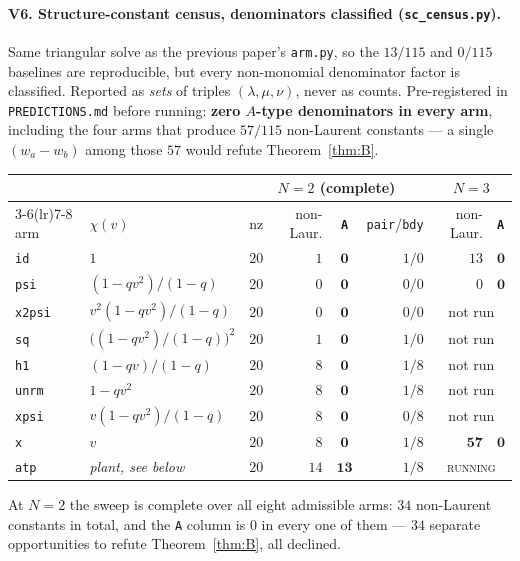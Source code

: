 \documentclass[11pt]{article}
\theoremstyle{plain}
\theoremstyle{definition}
\theoremstyle{remark}
\theoremstyle{plain}
\begin{document}
\paragraph{V6. Structure-constant census, denominators classified
(\texttt{sc\_census.py}).}
Same triangular solve as the previous paper's \texttt{arm.py}, so the $13/115$
and $0/115$ baselines are reproducible, but every non-monomial denominator factor
is classified.  Reported as \emph{sets} of triples $(\lambda,\mu,\nu)$, never as
counts.  Pre-registered in \texttt{PREDICTIONS.md} before running: \textbf{zero
$A$-type denominators in every arm}, including the four arms that produce
$57/115$ non-Laurent constants --- a single $(w_a-w_b)$ among those $57$ would
refute Theorem~\ref{thm:B}.
\begin{center}\small
\begin{tabular}{llrrcrrl}
\toprule
 & & \multicolumn{4}{c}{$N=2$ (complete)} & \multicolumn{2}{c}{$N=3$} \\
\cmidrule(lr){3-6}\cmidrule(lr){7-8}
arm & $\chi(v)$ & nz & non-Laur. & \textbf{\texttt{A}} & \texttt{pair}/\texttt{bdy} & non-Laur. & \textbf{\texttt{A}} \\\midrule
\texttt{id}    & $1$                   & $20$ & $1$  & $\mathbf{0}$ & $1/0$ & $13$ & $\mathbf{0}$ \\
\texttt{psi}   & $(1-qv^2)/(1-q)$      & $20$ & $0$  & $\mathbf{0}$ & $0/0$ & $0$  & $\mathbf{0}$ \\
\texttt{x2psi} & $v^2(1-qv^2)/(1-q)$   & $20$ & $0$  & $\mathbf{0}$ & $0/0$ & \multicolumn{2}{c}{not run} \\
\texttt{sq}    & $\bigl((1-qv^2)/(1-q)\bigr)^2$ & $20$ & $1$  & $\mathbf{0}$ & $1/0$ & \multicolumn{2}{c}{not run} \\
\texttt{h1}    & $(1-qv)/(1-q)$        & $20$ & $8$  & $\mathbf{0}$ & $1/8$ & \multicolumn{2}{c}{not run} \\
\texttt{unrm}  & $1-qv^2$              & $20$ & $8$  & $\mathbf{0}$ & $1/8$ & \multicolumn{2}{c}{not run} \\
\texttt{xpsi}  & $v(1-qv^2)/(1-q)$     & $20$ & $8$  & $\mathbf{0}$ & $0/8$ & \multicolumn{2}{c}{not run} \\
\texttt{x}     & $v$                   & $20$ & $8$  & $\mathbf{0}$ & $1/8$ & $\mathbf{57}$ & $\mathbf{0}$ \\\midrule
\texttt{atp}   & \emph{plant, see below} & $20$ & $14$ & $\mathbf{13}$ & $1/8$ & \multicolumn{2}{c}{\textsc{running}} \\
\bottomrule
\end{tabular}
\end{center}
At $N=2$ the sweep is complete over all eight admissible arms: $34$ non-Laurent
constants in total, and the \texttt{A} column is $0$ in every one of them --- $34$
separate opportunities to refute Theorem~\ref{thm:B}, all declined.
\end{document}
